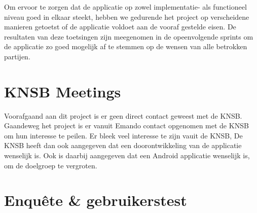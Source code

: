 Om ervoor te zorgen dat de applicatie op zowel implementatie- als functioneel niveau goed in elkaar steekt, hebben we gedurende het project op verscheidene manieren getoetst of de applicatie voldoet aan de vooraf gestelde eisen. De resultaten van deze toetsingen zijn meegenomen in de opeenvolgende sprints om de applicatie zo goed mogelijk af te stemmen op de wensen van alle betrokken partijen.

\section{KNSB Meetings}
Voorafgaand aan dit project is er geen direct contact geweest met de \ac{KNSB}. Gaandeweg het project is er vanuit Emando contact opgenomen met de \ac{KNSB} om hun interesse te peilen. Er bleek veel interesse te zijn vauit de \ac{KNSB}, De \ac{KNSB} heeft dan ook aangegeven dat een doorontwikkeling van de applicatie wenselijk is. Ook is daarbij aangegeven dat een Android applicatie wenselijk is, om de doelgroep te vergroten.

\section{Enquête \& gebruikerstest}


